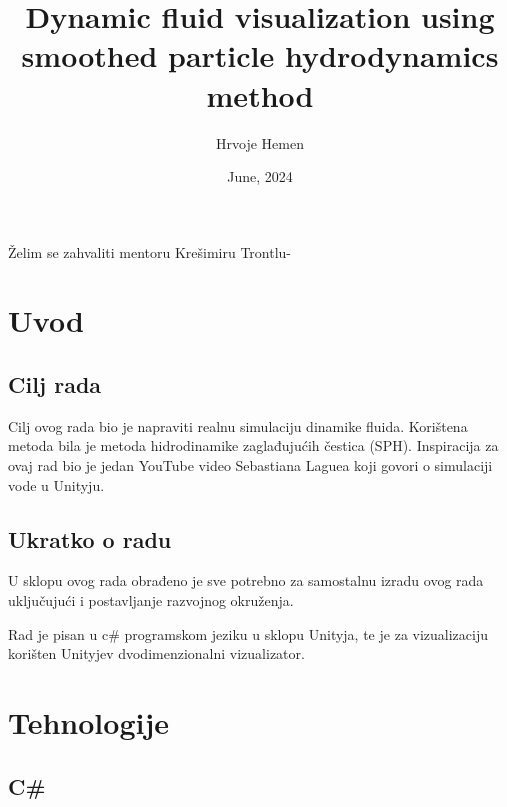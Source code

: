 \documentclass[diplomskirad]{fer}
\title{Dynamic fluid visualization using smoothed particle hydrodynamics method}
\author{Hrvoje Hemen}
\date{June, 2024}
\begin{document}
    \maketitle
    \begin{zahvale}
        Želim se zahvaliti mentoru Krešimiru Trontlu-
    \end{zahvale}
    \mainmatter
    \tableofcontents
    \chapter{Uvod}\label{ch:uvod}

    \section{Cilj rada}\label{sec:cilj-rada}

    Cilj ovog rada bio je napraviti realnu simulaciju dinamike fluida.
    Korištena metoda bila je metoda hidrodinamike zaglađujućih čestica (SPH).
    Inspiracija za ovaj rad bio je jedan YouTube video Sebastiana Laguea koji govori o simulaciji vode u Unityju.

    \section{Ukratko o radu}\label{sec:ukratko-o-radu}

    U sklopu ovog rada obrađeno je sve potrebno za samostalnu izradu ovog rada uključujući i postavljanje razvojnog okruženja.

    Rad je pisan u c\# programskom jeziku u sklopu Unityja, te je za vizualizaciju korišten Unityjev dvodimenzionalni vizualizator.


    \chapter{Tehnologije}\label{ch:tehnologije}

    \section{C\#}\label{sec:c}
\end{document}
